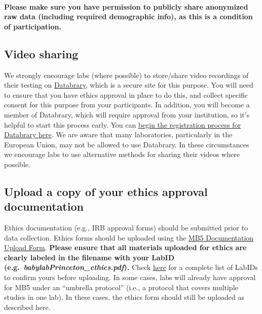 \documentclass[
]{book}
\begin{document}
\paragraph*{Please make sure you have permission to publicly share anonymized raw data (including required demographic info), as this is a condition of participation.}\label{please-make-sure-you-have-permission-to-publicly-share-anonymized-raw-data-including-required-demographic-info-as-this-is-a-condition-of-participation.}

\subsection{Video sharing}\label{video-sharing}

We strongly encourage labs (where possible) to store/share video recordings of their testing on \href{https://nyu.databrary.org/}{Databrary}, which is a secure site for this purpose. You will need to ensure that you have ethics approval in place to do this, and collect specific consent for this purpose from your participants. In addition, you will become a member of Databrary, which will require approval from your institution, so it's helpful to start this process early. You can \href{https://nyu.databrary.org/user/register?page=create}{begin the registration process for Databrary here}. We are aware that many laboratories, particularly in the European Union, may not be allowed to use Databrary. In these circumstances we encourage labs to use alternative methods for sharing their videos where possible.

\subsection{Upload a copy of your ethics approval documentation}\label{ethics-upload}

Ethics documentation (e.g., IRB approval forms) should be submitted prior to data collection. Ethics forms should be uploaded using the \href{https://docs.google.com/forms/d/e/1FAIpQLScTTmcQl1P1F4UWe95Jo7u5bken40AyAefXCYUJ9iYbnWaG8Q/viewform?usp=sf_link}{MB5 Documentation Upload Form}. \textbf{Please ensure that all materials uploaded for ethics are clearly labeled in the filename with your LabID (e.g.~\emph{babylabPrinceton\_ethics.pdf}).} Check \href{https://manybabies.org/labids/}{here} for a complete list of LabIDs to confirm yours before uploading. In some cases, labs will already have approval for MB5 under an ``umbrella protocol'' (i.e., a protocol that covers multiple studies in one lab). In these cases, the ethics form should still be uploaded as described here.
\end{document}
